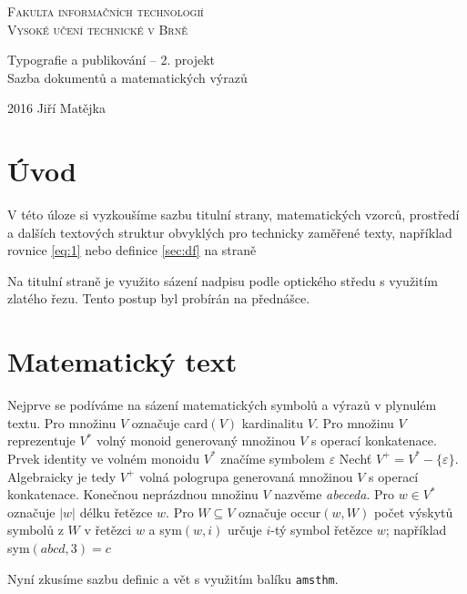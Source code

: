 \documentclass[a4paper, 11pt, twocolumn]{article}
\theoremstyle{plain}
\theoremstyle{definition}
\theoremstyle{plain}
\begin{document}
\onecolumn
{
\begin{center}

\Huge
\textsc{
Fakulta informačních technologií \\
Vysoké učení technické v Brně}\\


\LARGE
Typografie a publikování -- 2. projekt \\
Sazba dokumentů a matematických výrazů\\

\end{center}

\Large{2016} \hfill Jiří Matějka
}%
\thispagestyle{empty}


\newpage
\setcounter{page}{1}
\twocolumn


\section*{Úvod}
V této úloze si vyzkoušíme sazbu titulní strany, matematických vzorců, prostředí
a dalších textových struktur obvyklých pro technicky zaměřené texty, například
rovnice \eqref{eq:1} nebo definice \ref{sec:df} na straně \pageref{sec:df}


Na titulní straně je využito sázení nadpisu podle optického středu s využitím zlatého řezu.
Tento postup byl probírán na přednášce.

\section{Matematický text}
Nejprve se podíváme na sázení matematických symbolů a výrazů v plynulém textu.
Pro množinu $V$ označuje card$(V)$ kardinalitu $V$. Pro množinu $V$ reprezentuje
$V^{*}$ volný monoid generovaný množinou $V$ s operací konkatenace. Prvek
identity ve volném monoidu $V^{*}$ značíme symbolem $\varepsilon$ Nechť
$V^{+} = V^{*} - \{ \varepsilon \}$. Algebraicky je tedy $V^{+}$ volná pologrupa
generovaná množinou $V$ s operací konkatenace. Konečnou neprázdnou množinu $V$
nazvěme \emph{abeceda}. Pro $w \in V^{*}$  označuje $|w|$ délku řetězce $w$. Pro
$W \subseteq V$ označuje occur$(w, W)$ počet výskytů symbolů z $W$ v řetězci $w$
a sym$(w, i)$ určuje $i$-tý symbol řetězce $w$; například sym$(abcd, 3) = c$


Nyní zkusíme sazbu definic a vět s využitím balíku \texttt{amsthm}.
\end{document}

